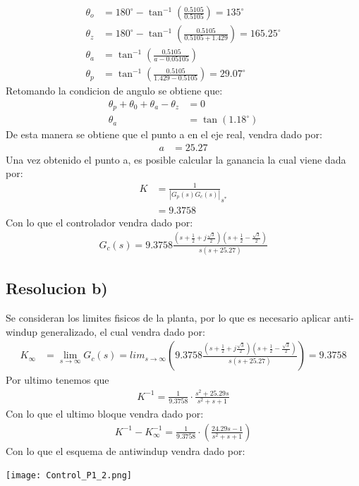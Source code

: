 \documentclass[
  11pt,
  letterpaper,
   addpoints,
  ]{exam}
\begin{document}
\begin{questions}
\begin{solution}
\begin{align}
        \theta_o &= 180^{\circ} - \tan^{-1}\left(\frac{0.5105}{0.5105}\right) = 135^{\circ} \\
        \theta_z &= 180^{\circ} - \tan^{-1}\left(\frac{0.5105}{0.5105 + 1.429}\right) = 165.25^{\circ} \\
        \theta_a &= \tan^{-1}\left( \frac{0.5105}{a - 0.05105}\right) \\
        \theta_p &= \tan^{-1}\left( \frac{0.5105}{1.429 - 0.5105}\right) = 29.07^{\circ}
    \end{align}
    Retomando la condicion de angulo se obtiene que:
    \begin{align}
        \theta_p + \theta_0 + \theta_a - \theta_z &= 0\\
        \theta_{a}&=\tan(1.18^{\circ})
    \end{align}
    De esta manera se obtiene que el punto a en el eje real, vendra dado por:
    \begin{align}
        a &=25.27
    \end{align}
    Una vez obtenido el punto a, es posible calcular la ganancia la cual viene dada por:
    \begin{align}
        K &= \frac{1}{|G_{p}(s)G_{c}(s)|}_{s^{*}}\\
        &=9.3758
    \end{align}
    Con lo que el controlador vendra dado por:
    \begin{align}
        G_{c}(s) = 9.3758 \frac{\left(s + \frac{1}{2} + j\frac{\sqrt{3}}{2}\right)\left(s+ \frac{1}{2} - \frac{\sqrt{3}}{2}\right)}{s(s+25.27)}
    \end{align}
    \subsection*{Resolucion b)}
    Se consideran los limites fisicos de la planta, por lo que es necesario aplicar anti-windup generalizado, el cual vendra dado por:
    \begin{align}
        K_{\infty} &= \lim_{s \to \infty} 
            G_{c}(s) = lim_{s \to \infty} \left(9.3758 \frac{\left(s + \frac{1}{2} + j\frac{\sqrt{3}}{2}\right)\left(s+ \frac{1}{2} - \frac{\sqrt{3}}{2}\right)}{s(s+25.27)}\right)
        = 9.3758
    \end{align}
Por ultimo tenemos que
\begin{align}
    K^{-1} = \frac{1}{9.3758} \cdot \frac{s^{2} + 25.29s}{s^{2}+s +1}
\end{align}
Con lo que el ultimo bloque vendra dado por:
\begin{align}
    K^{-1} - K_{\infty}^{-1} = \frac{1}{9.3758} \cdot \left(\frac{24.29s-1}{s^{2}+s+1}\right)
\end{align}
Con lo que el esquema de antiwindup vendra dado por:
\begin{center}
    \texttt{[image: Control\_P1\_2.png]}
  \end{center}

\end{solution}
\end{questions}
\end{document}

